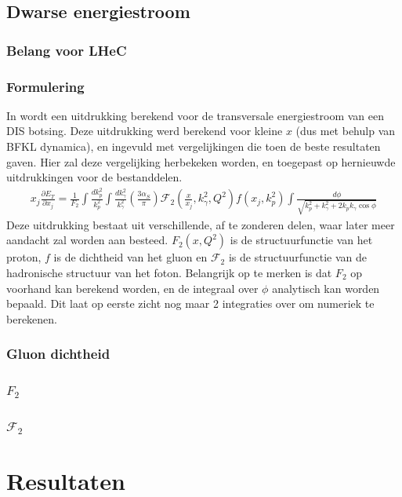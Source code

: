 \documentclass[a4paper,11pt]{article}
\numberwithin{equation}{section} %
\begin{document}
  \subsection{Dwarse energiestroom}
    \subsubsection{Belang voor LHeC}
    \subsubsection{Formulering}
In \cite{ET} wordt een uitdrukking berekend voor de transversale energiestroom van een DIS botsing.
Deze uitdrukking werd berekend voor kleine $x$ (dus met behulp van BFKL dynamica), en ingevuld met vergelijkingen die toen de beste resultaten gaven.
Hier zal deze vergelijking herbekeken worden, en toegepast op hernieuwde uitdrukkingen voor de bestanddelen.
\begin{align} \label{eq:ET}
x_j \frac{\partial E_T}{\partial x_j} = \frac{1}{F_2} \int \frac{dk_p^2}{k_p^2} \int \frac{dk_\gamma^2}{k_\gamma^2} \left( \frac{3\alpha_S}{\pi} \right) \mathcal{F}_2 \left( \frac{x}{x_j}, k_\gamma^2, Q^2 \right) f(x_j,k_p^2) \int \frac{d\phi}{\sqrt{k_p^2+k_\gamma^2+2k_p k_\gamma \cos{\phi}}}
\end{align}
Deze uitdrukking bestaat uit verschillende, af te zonderen delen, waar later meer aandacht zal worden aan besteed.
$F_2 (x, Q^2)$ is de structuurfunctie van het proton, $f$ is de dichtheid van het gluon en $\mathcal{F}_2$ is de structuurfunctie van de hadronische structuur van het foton.
Belangrijk op te merken is dat $F_2$ op voorhand kan berekend worden, en de integraal over $\phi$ analytisch kan worden bepaald.
Dit laat op eerste zicht nog maar 2 integraties over om numeriek te berekenen.


    
    \subsubsection{Gluon dichtheid}
    \subsubsection{$F_2$}
    \subsubsection{$\mathcal{F}_2$}


\section{Resultaten}
\end{document}
